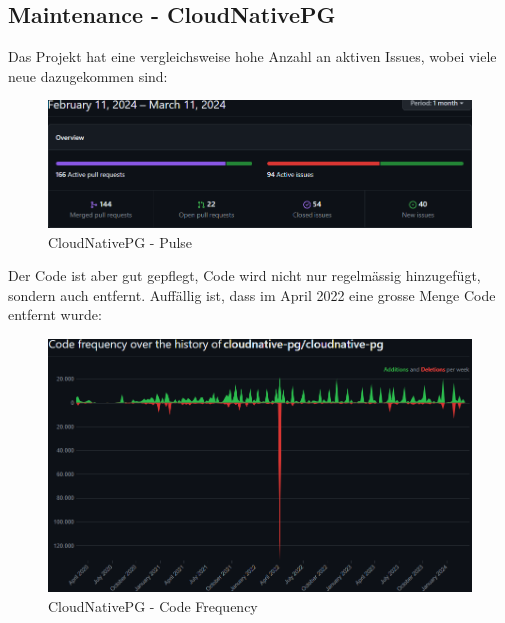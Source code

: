 
\begin{flushleft}
    \subsection{Maintenance - CloudNativePG}
    \label{subsec:maintenance_cloudnativepg}
    Das Projekt hat eine vergleichsweise hohe Anzahl an aktiven Issues, wobei viele neue dazugekommen sind:
    \begin{figure}[H]
        \centering
        \includegraphics[width=0.75\linewidth]{source/implementation/evaluation/postgresql_ha_solutions/insights/cloudnativepg/pulse_cloudnative-pg_cloudnative-pg}
        \caption{CloudNativePG - Pulse}
        \label{fig:pulse_cloudnative-pg_cloudnative-pg}
    \end{figure}

    Der Code ist aber gut gepflegt, Code wird nicht nur regelmässig hinzugefügt, sondern auch entfernt.
    Auffällig ist, dass im April 2022 eine grosse Menge Code entfernt wurde:
    \begin{figure}[H]
        \centering
        \includegraphics[width=0.75\linewidth]{source/implementation/evaluation/postgresql_ha_solutions/insights/cloudnativepg/code_frequency_cloudnative-pg_cloudnative-pg}
        \caption{CloudNativePG - Code Frequency}
        \label{fig:code_frequency_cloudnative-pg_cloudnative-pg}
    \end{figure}


\end{flushleft}
